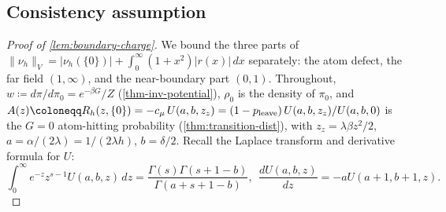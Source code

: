 \documentclass[aap,preprint]{imsart}
\numberwithin{equation}{section}
\theoremstyle{plain}
\theoremstyle{definition}
\begin{document}
\subsection{Consistency assumption}\label{app:smooth-bias}


\begin{proof}[Proof of \cref{lem:boundary-charge}]\label{app:smooth-consistency}
We bound the three parts of $\|\nu_h\|_{V}=|\nu_h(\{0\})|+\int_0^\infty(1+x^2)|r(x)|\,dx$ separately: the atom defect, the far field $(1,\infty)$, and the near-boundary part $(0,1)$.  Throughout, $w\coloneqq d\pi/d\pi_0=e^{-\beta G}/Z$ (\cref{thm-inv-potential}), $\rho_0$ is the density of $\pi_0$, and $A(z)\coloneqq R_h(z,\{0\})=-c_\mu\,U(a,b,z_z)=(1-p_{\rm leave})\,U(a,b,z_z)/U(a,b,0)$ is the $G=0$ atom-hitting probability (\cref{thm:transition-dist}), with  $z_z=\lambda\beta z^2/2$, $a=\alpha/(2\lambda)=1/(2\lambda h)$, $b=\delta/2$.  Recall the  Laplace transform and derivative formula \cite[(13.10.7), (13.3.22)]{Olver2010} for $U$:
\begin{equation}\label{eq:kummer-moment}
 \! \int_0^\infty e^{-z}z^{s-1}U(a,b,z)\,dz=\frac{\Gamma(s)\Gamma(s+1-b)}{\Gamma(a+s+1-b)},
  \;\,
  \frac{d U(a,b,z)}{dz}=-aU(a+1,b+1,z).
\end{equation}


\end{proof}
\end{document}

